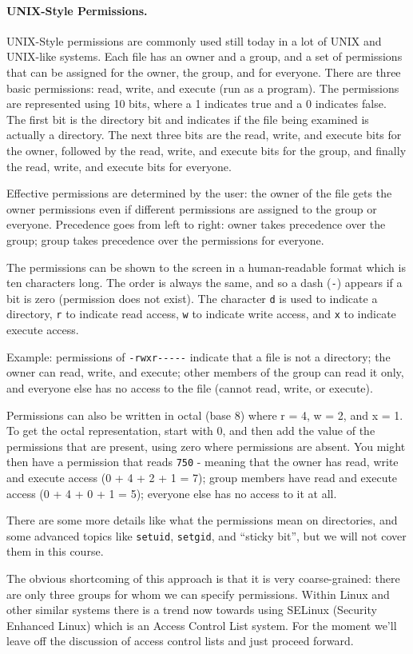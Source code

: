 \paragraph{UNIX-Style Permissions.}
UNIX-Style permissions are commonly used still today in a lot of UNIX and UNIX-like systems. Each file has an owner and a group, and a set of permissions that can be assigned for the owner, the group, and for everyone. There are three basic permissions: read, write, and execute (run as a program). The permissions are represented using 10 bits, where a 1 indicates true and a 0 indicates false. The first bit is the directory bit and indicates if the file being examined is actually a directory. The next three bits are the read, write, and execute bits for the owner, followed by the read, write, and execute bits for the group, and finally the read, write, and execute bits for everyone.

Effective permissions are determined by the user: the owner of the file gets the owner permissions even if different permissions are assigned to the group or everyone. Precedence goes from left to right: owner takes precedence over the group; group takes precedence over the permissions for everyone.

The permissions can be shown to the screen in a human-readable format which is ten characters long. The order is always the same, and so a dash (\texttt{-}) appears if a bit is zero (permission does not exist). The character \texttt{d} is used to indicate a directory, \texttt{r} to indicate read access, \texttt{w} to indicate write access, and \texttt{x} to indicate execute access.

Example: permissions of \texttt{-rwxr{-}{-}{-}{-}{-}} indicate that a file is not a directory; the owner can read, write, and execute; other members of the group can read it only, and everyone else has no access to the file (cannot read, write, or execute). 

Permissions can also be written in octal (base 8) where r = 4, w = 2, and x = 1. To get the octal representation, start with 0, and then add the value of the  permissions that are present, using zero where permissions are absent. You might then have a permission that reads \texttt{750} - meaning that the owner has read, write and execute access (0 + 4 + 2 + 1 = 7); group members have read and execute access (0 + 4 + 0 + 1 = 5); everyone else has no access to it at all.

There are some more details like what the permissions mean on directories, and some advanced topics like \texttt{setuid}, \texttt{setgid}, and ``sticky bit'', but we will not cover them in this course.

The obvious shortcoming of this approach is that it is very coarse-grained: there are only three groups for whom we can specify permissions. Within Linux and other similar systems there is a trend now towards using SELinux (Security Enhanced Linux) which is an Access Control List system. For the moment we'll leave off the discussion of access control lists and just proceed forward.



